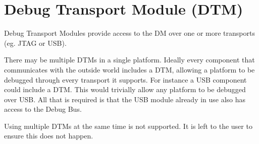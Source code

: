 \section{Debug Transport Module (DTM)}
\label{sec:dtm}

Debug Transport Modules provide access to the DM over one or more transports
(eg. JTAG or USB).

There may be multiple DTMs in a single platform. Ideally every component that
communicates with the outside world includes a DTM, allowing a platform to be
debugged through every transport it supports.  For instance a USB component
could include a DTM. This would trivially allow any platform to be debugged
over USB. All that is required is that the USB module already in use also has
access to the Debug Bus.

Using multiple DTMs at the same time is not supported. It is left to the user
to ensure this does not happen.
